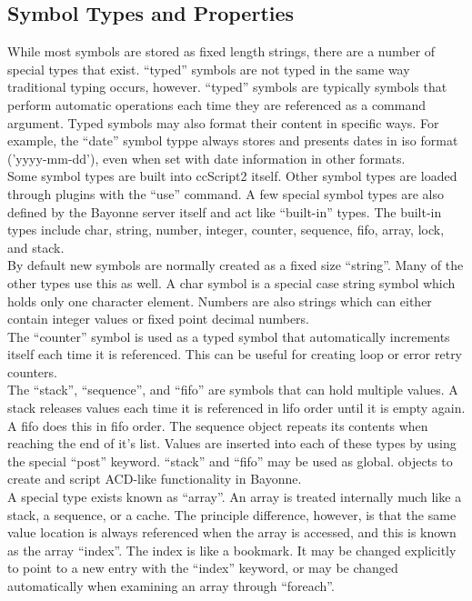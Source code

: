 \documentclass[a4paper,12pt]{article}
\begin{document}
\subsection{Symbol Types and Properties}

While most symbols are stored as fixed length strings, there are a
number of special types that exist.  ``typed'' symbols are not typed in
the same way traditional typing occurs, however.  ``typed'' symbols are
typically symbols that perform automatic operations each time they are
referenced as a command argument.  Typed symbols may also format their
content in specific ways.  For example, the ``date'' symbol typpe always
stores and presents dates in iso format ('yyyy-mm-dd'), even when set
with date information in other formats. \\

Some symbol types are built into ccScript2 itself.  Other symbol types
are loaded through plugins with the ``use'' command.  A few special
symbol types are also defined by the Bayonne server itself and act like
``built-in'' types.  The built-in types include char, string, number,
integer, counter, sequence, fifo, array, lock, and stack. \\

By default new symbols are normally created as a fixed size ``string''. 
Many of the other types use this as well.  A char symbol is a special case
string symbol which holds only one character element.  Numbers are also
strings which can either contain integer values or fixed point decimal
numbers. \\

The ``counter'' symbol is used as a typed symbol that automatically 
increments itself each time it is referenced.  This can be useful for 
creating loop or error retry counters. \\

The ``stack'', ``sequence'', and ``fifo'' are symbols that can hold 
multiple values.  A stack releases values each time it is referenced in 
lifo order until it is empty again.  A fifo does this in fifo order.  The 
sequence object repeats its contents when reaching the end of it's list.  
Values are inserted into each of these types by using the special ``post'' 
keyword.   ``stack'' and ``fifo'' may be used as global. objects to 
create and script ACD-like functionality in Bayonne. \\

A special type exists known as ``array''.  An array is treated
internally much like a stack, a sequence, or a cache.  The principle
difference, however, is that the same value location is always
referenced when the array is accessed, and this is known as the array
``index''.  The index is like a bookmark.  It may be changed explicitly
to point to a new entry with the ``index'' keyword, or may be changed
automatically when examining an array through ``foreach''. \\  
\end{document}
